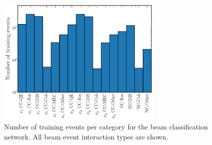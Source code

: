 \begin{figure} %
    \includegraphics[width=0.7\textwidth]{diagrams/6-cvn/chipsnet/explore_beam_training_sample.pdf}
    \caption[Number of training events per category for the beam classification network.]
    {Number of training events per category for the beam classification network. All beam event
        interaction types are shown.}
    \label{fig:beam_training_sample}
\end{figure}

